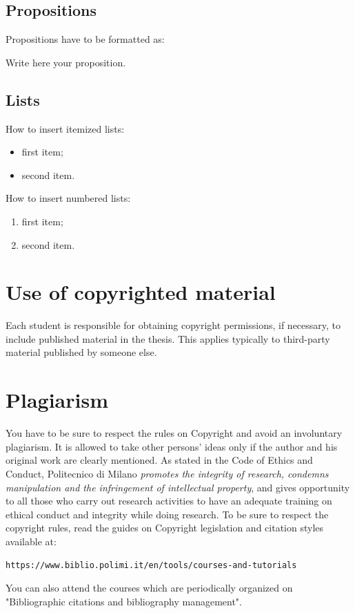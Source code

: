 \documentclass{Configuration_Files/PoliMi3i_thesis}
\begin{document}
\subsection{Propositions}
Propositions have to be formatted as:
\begin{proposition}
Write here your proposition.
\end{proposition}

\subsection{Lists}
How to  insert itemized lists:
\begin{itemize}
    \item first item;
    \item second item.
\end{itemize}
How to insert numbered lists:
\begin{enumerate}
    \item first item;
    \item second item.
\end{enumerate}

\section{Use of copyrighted material}

Each student is responsible for obtaining copyright permissions, if necessary, to include published material in the thesis.
This applies typically to third-party material published by someone else.

\section{Plagiarism}

You have to be sure to respect the rules on Copyright and avoid an involuntary plagiarism.
It is allowed to take other persons' ideas only if the author and his original work are clearly mentioned.
As stated in the Code of Ethics and Conduct, Politecnico di Milano \textit{promotes the integrity of research,
condemns manipulation and the infringement of intellectual property}, and gives opportunity to all those
who carry out research activities to have an adequate training on ethical conduct and integrity while doing research.
To be sure to respect the copyright rules, read the guides on Copyright legislation and citation styles available
at:
\begin{verbatim}
https://www.biblio.polimi.it/en/tools/courses-and-tutorials
\end{verbatim}
You can also attend the courses which are periodically organized on "Bibliographic citations and bibliography management".
\end{document}
